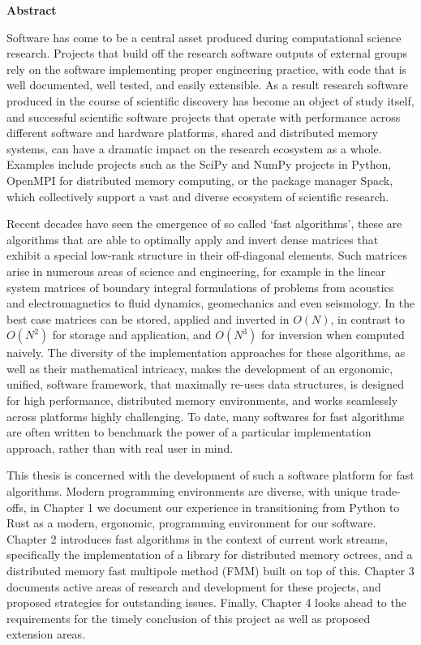 \thispagestyle{plain}

\begin{center}
    \textbf{Abstract}
\end{center}

Software has come to be a central asset produced during
computational science research. Projects that build off the research software outputs of external
groups rely on the software implementing proper engineering practice,
with code that is well documented, well tested, and easily extensible. As a
result research software produced in the course of scientific discovery has
become an object of study itself, and successful scientific software projects
that operate with performance across different software and hardware platforms,
shared and distributed memory systems, can have a dramatic impact on the
research ecosystem as a whole. Examples include projects such as the SciPy and
NumPy projects in Python, OpenMPI for distributed memory computing, or the package
manager Spack, which collectively support a vast and diverse ecosystem of scientific
research.

Recent decades have seen the emergence of so called `fast algorithms', these are
algorithms that are able to optimally apply and invert dense matrices that exhibit
a special low-rank structure in their off-diagonal elements. Such matrices arise
in numerous areas of science and engineering, for example in the linear system
matrices of boundary integral formulations of problems from acoustics and
electromagnetics to fluid dynamics, geomechanics and even seismology. In the
best case matrices can be stored, applied and inverted in $O(N)$, in contrast
to $O(N^2)$ for storage and application, and $O(N^3)$ for inversion when computed
naively. The diversity of the implementation approaches for these algorithms, as
well as their mathematical intricacy, makes the development of an ergonomic,
unified, software framework, that maximally re-uses data structures, is designed
for high performance, distributed memory environments, and works seamlessly
across platforms highly challenging. To date, many softwares for fast algorithms
are often written to benchmark the power of a particular implementation approach,
rather than with real user in mind.

This thesis is concerned with the development of such a software platform
for fast algorithms. Modern programming environments are diverse, with unique trade-offs, in Chapter 1 we document our experience in transitioning from Python to Rust as a
modern, ergonomic, programming environment for our software. Chapter 2 introduces
fast algorithms in the context of current work streams, specifically the
implementation of a library for distributed memory octrees, and a distributed memory fast
multipole method (FMM) built on top of this. Chapter 3 documents active areas
of research and development for these projects, and proposed strategies for
outstanding issues. Finally, Chapter 4 looks ahead to the requirements for the
timely conclusion of this project as well as proposed extension areas.
